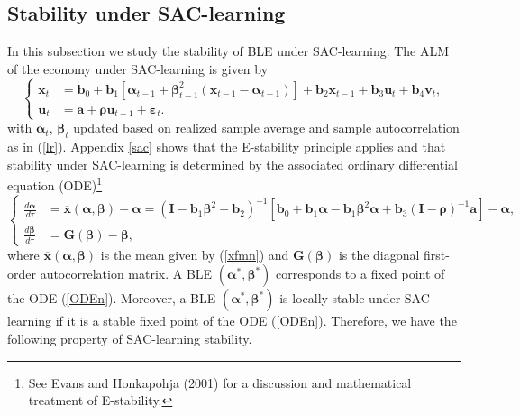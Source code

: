 \subsection*{Stability under SAC-learning}
In this subsection we study the stability of BLE under
SAC-learning. The ALM of the economy under SAC-learning is given by
\begin{equation}\label{modelmpnsacx}
    \left\{
    \begin{split}
          {\pmb x}_t&={\pmb b}_0+{\pmb b}_1[\pmb\alpha_{t-1}+{\pmb\beta}^2_{t-1}(\pmb x_{t-1}-\pmb\alpha_{t-1})]+ {\pmb b}_2{\pmb x}_{t-1}+{\pmb b}_3{\pmb u}_t + {\pmb b}_4{\pmb v}_t,\\
           \pmb{u}_t&=\pmb{a}+\pmb{\rho}\pmb{u}_{t-1}+\pmb{\varepsilon}_t.
    \end{split}
    \right.
    \end{equation}
with $\pmb\alpha_t$, $\pmb\beta_t$ updated based on realized sample average
and sample autocorrelation as in (\ref{lr}). Appendix \ref{sac} shows that
the E-stability principle applies and that stability under
SAC-learning is determined by the associated ordinary differential
equation (ODE)\footnote{See Evans and Honkapohja (2001) for a
discussion and mathematical treatment of E-stability.}
\begin{equation}\label{ODEn}
    \left\{
    \begin{split}
          \frac{d\pmb\alpha}{d\tau}&=
          \overline{\pmb x}(\pmb\alpha,\pmb\beta)-\pmb\alpha =
          (\pmb I-{\pmb b}_1{\pmb\beta}^2-{\pmb b}_2)^{-1}[ {\pmb b}_0+{\pmb b}_1\pmb\alpha-{\pmb b}_1\pmb\beta^2\pmb\alpha+{\pmb b}_3
(\pmb I-\pmb \rho)^{-1}\pmb a]-\pmb\alpha, \\
\frac{d{\pmb\beta}}{d\tau}&={\pmb G}({\pmb\beta})-{\pmb\beta},
    \end{split}
    \right.
\end{equation}
where $\overline{\pmb x}(\pmb\alpha,\pmb\beta)$ is the mean
given by (\ref{xfmn}) and ${\pmb G}({\pmb\beta})$ is the diagonal first-order
autocorrelation matrix. A BLE $(\pmb\alpha^*,{\pmb\beta}^*)$ corresponds to a
fixed point of the ODE (\ref{ODEn}). Moreover, a BLE
$(\pmb\alpha^*,{\pmb\beta}^*)$ is locally stable under SAC-learning
if it is a stable fixed point of the ODE (\ref{ODEn}). Therefore, we have the following property of SAC-learning stability.

